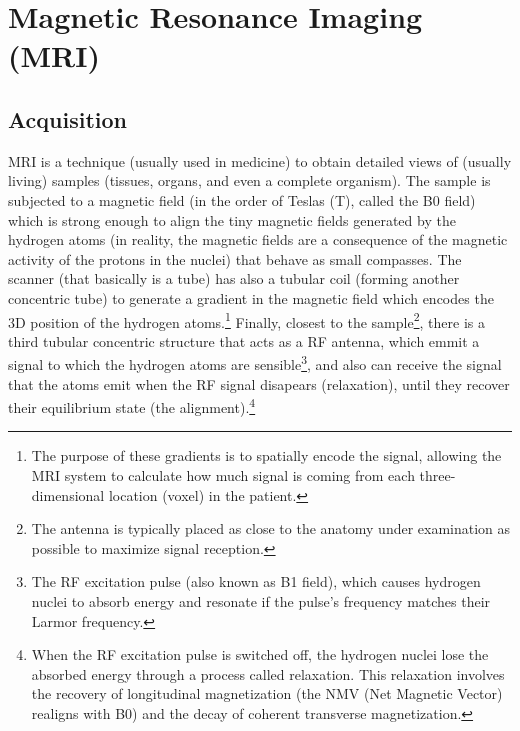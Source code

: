 \chapter{Magnetic Resonance Imaging (MRI)}

\section{Acquisition}
\gls{MRI} is a technique (usually used in medicine) to obtain detailed
views of (usually living) samples (tissues, organs, and even a
complete organism). The sample is subjected to a magnetic field (in
the order of Teslas (T), called the B0 field) which is strong enough
to align the tiny magnetic fields generated by the hydrogen atoms (in
reality, the magnetic fields are a consequence of the magnetic
activity of the protons in the nuclei) that behave as small
compasses. The scanner (that basically is a tube) has also a tubular
coil (forming another concentric tube) to generate a gradient in the
magnetic field which encodes the 3D position of the hydrogen
atoms.\footnote{The purpose of these gradients is to spatially encode
  the signal, allowing the MRI system to calculate how much signal is
  coming from each three-dimensional location (voxel) in the patient.}
Finally, closest to the sample\footnote{The antenna is typically
  placed as close to the anatomy under examination as possible to
  maximize signal reception.}, there is a third tubular concentric
structure that acts as a RF antenna, which emmit a signal to which the
hydrogen atoms are sensible\footnote{The RF excitation pulse (also
  known as B1 field), which causes hydrogen nuclei to absorb energy
  and resonate if the pulse's frequency matches their Larmor
  frequency.}, and also can receive the signal that the atoms emit
when the RF signal disapears (relaxation), until they recover their
equilibrium state (the alignment).\footnote{When the RF excitation
  pulse is switched off, the hydrogen nuclei lose the absorbed energy
  through a process called relaxation. This relaxation involves the
  recovery of longitudinal magnetization (the NMV (Net Magnetic
  Vector) realigns with B0) and the decay of coherent transverse
  magnetization.}

